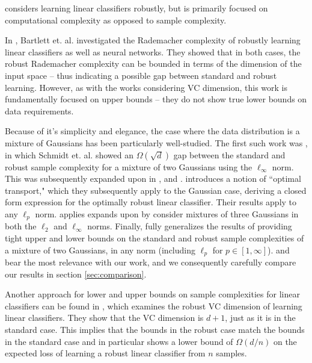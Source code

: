 \cite{Kane20} considers learning linear classifiers robustly, but is primarily focused on computational complexity as opposed to sample complexity.

In \cite{bartlett19}, Bartlett et. al. investigated the Rademacher complexity of robustly learning linear classifiers as well as neural networks. They showed that in both cases, the robust Rademacher complexity can be bounded in terms of the dimension of the input space -- thus indicating a possible gap between standard and robust learning. However, as with the works considering VC dimension, this work is fundamentally focused on upper bounds  -- they do not show true lower bounds on data requirements.

Because of it's simplicity and elegance, the case where the data distribution is a mixture of Gaussians has been particularly well-studied. The first such work was \cite{Schmidt18}, in which Schmidt et. al. showed an $\Omega(\sqrt{d})$ gap between the standard and robust sample complexity for a mixture of two Gaussians using the $\ell_\infty$ norm. This was subsequently expanded upon in \cite{Bhagoji19}, \cite{robey20} and  \cite{ravikumar20}. \cite{Bhagoji19} introduces a notion of ``optimal transport," which they subsequently apply to the Gaussian case, deriving a closed form expression for the optimally robust linear classifier. Their results apply to any $\ell_p$ norm. \cite{robey20} applies expands upon \cite{Schmidt18} by consider mixtures of three Gaussians in both the $\ell_2$ and $\ell_\infty$ norms. Finally, \cite{ravikumar20} fully generalizes the results of \cite{Schmidt18} providing tight upper and lower bounds on the standard and robust sample complexities of a mixture of two Gaussians, in any norm (including $\ell_p$ for $p \in [1, \infty]$). \cite{Schmidt18} and \cite{ravikumar20} bear the most relevance with our work, and we consequently carefully compare our results in section \ref{sec:comparison}.

Another approach for lower and upper bounds on sample complexities for linear classifiers can be found in \cite{Cullina18}, which examines the robust VC dimension of learning linear classifiers. They show that the VC dimension is $d+1$, just as it is in the standard case. This implies that the bounds in the robust case match the bounds in the standard case and in particular shows a lower bound of $\Omega(d/n)$ on the expected loss of learning a robust linear classifier from $n$ samples.

